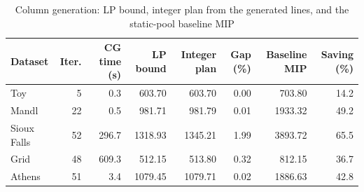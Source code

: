 \begin{table}[htbp]
  \centering
  \caption{Column generation: LP bound, integer plan from the generated lines, and the static-pool baseline MIP}
  \label{tab:cg_results}
  \begin{tabular}{lrrrrrrr}
    \toprule
    Dataset & Iter. & CG time (s) & LP bound & Integer plan & Gap (\%) & Baseline MIP & Saving (\%) \\
    \midrule
    Toy & 5 & 0.3 & 603.70 & 603.70 & 0.00 & 703.80 & 14.2 \\
    Mandl & 22 & 0.5 & 981.71 & 981.79 & 0.01 & 1933.32 & 49.2 \\
    Sioux Falls & 52 & 296.7 & 1318.93 & 1345.21 & 1.99 & 3893.72 & 65.5 \\
    Grid & 48 & 609.3 & 512.15 & 513.80 & 0.32 & 812.15 & 36.7 \\
    Athens & 51 & 3.4 & 1079.45 & 1079.71 & 0.02 & 1886.63 & 42.8 \\
    \bottomrule
  \end{tabular}
\end{table}
